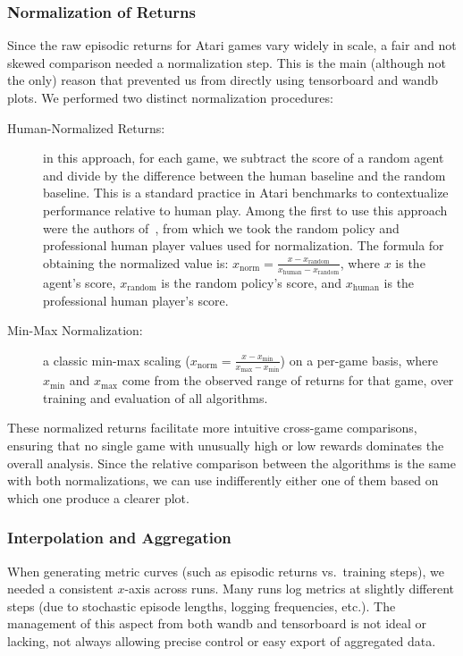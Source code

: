 \subsubsection{Normalization of Returns}
\label{subsubsec:normalization}
Since the raw episodic returns for Atari games vary widely in scale, a fair and not skewed comparison needed a normalization step. This is the main (although not the only) reason that prevented us from directly using tensorboard and wandb plots. We performed two distinct normalization procedures:
\begin{description}
	\item[Human-Normalized Returns:] in this approach, for each game, we subtract the score of a random agent and divide by the difference between the human baseline and the random baseline. This is a standard practice in Atari benchmarks to contextualize performance relative to human play. Among the first to use this approach were the authors of~\cite{mnih:human}, from which we took the random policy and professional human player values used for normalization. The formula for obtaining the normalized value is: $x_{\text{norm}} = \frac{x - x_\text{random}}{x_\text{human} - x_\text{random}}$, where $x$ is the agent's score, $x_\text{random}$ is the random policy's score, and $x_\text{human}$ is the professional human player's score.
	\item[Min-Max Normalization:] a classic min-max scaling ($x_{\text{norm}} = \frac{x - x_{\min}}{x_{\max} - x_{\min}}$) on a per-game basis, where $x_{\min}$ and $x_{\max}$ come from the observed range of returns for that game, over training and evaluation of all algorithms.
\end{description}
These normalized returns facilitate more intuitive cross-game comparisons, ensuring that no single game with unusually high or low rewards dominates the overall analysis. Since the relative comparison between the algorithms is the same with both normalizations, we can use indifferently either one of them based on which one produce a clearer plot.

\subsubsection{Interpolation and Aggregation}
When generating metric curves (such as episodic returns vs.\ training steps), we needed a consistent $x$-axis across runs. Many runs log metrics at slightly different steps (due to stochastic episode lengths, logging frequencies, etc.). The management of this aspect from both wandb and tensorboard is not ideal or lacking, not always allowing precise control or easy export of aggregated data.


